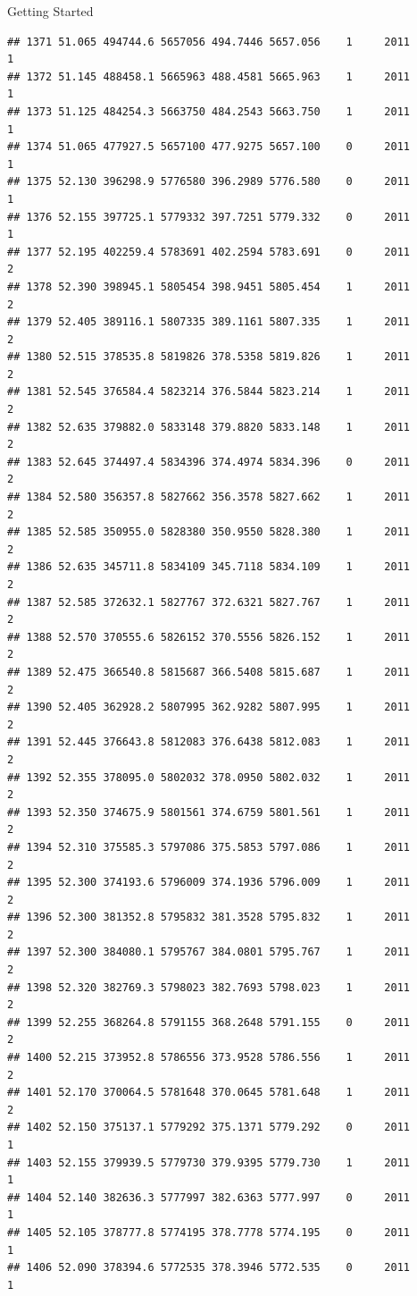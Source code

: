 \documentclass[
  ignorenonframetext,
]{beamer}
\begin{document}
\begin{frame}[fragile]{Getting Started}
\begin{verbatim}
## 1371 51.065 494744.6 5657056 494.7446 5657.056    1     2011        1
## 1372 51.145 488458.1 5665963 488.4581 5665.963    1     2011        1
## 1373 51.125 484254.3 5663750 484.2543 5663.750    1     2011        1
## 1374 51.065 477927.5 5657100 477.9275 5657.100    0     2011        1
## 1375 52.130 396298.9 5776580 396.2989 5776.580    0     2011        1
## 1376 52.155 397725.1 5779332 397.7251 5779.332    0     2011        1
## 1377 52.195 402259.4 5783691 402.2594 5783.691    0     2011        2
## 1378 52.390 398945.1 5805454 398.9451 5805.454    1     2011        2
## 1379 52.405 389116.1 5807335 389.1161 5807.335    1     2011        2
## 1380 52.515 378535.8 5819826 378.5358 5819.826    1     2011        2
## 1381 52.545 376584.4 5823214 376.5844 5823.214    1     2011        2
## 1382 52.635 379882.0 5833148 379.8820 5833.148    1     2011        2
## 1383 52.645 374497.4 5834396 374.4974 5834.396    0     2011        2
## 1384 52.580 356357.8 5827662 356.3578 5827.662    1     2011        2
## 1385 52.585 350955.0 5828380 350.9550 5828.380    1     2011        2
## 1386 52.635 345711.8 5834109 345.7118 5834.109    1     2011        2
## 1387 52.585 372632.1 5827767 372.6321 5827.767    1     2011        2
## 1388 52.570 370555.6 5826152 370.5556 5826.152    1     2011        2
## 1389 52.475 366540.8 5815687 366.5408 5815.687    1     2011        2
## 1390 52.405 362928.2 5807995 362.9282 5807.995    1     2011        2
## 1391 52.445 376643.8 5812083 376.6438 5812.083    1     2011        2
## 1392 52.355 378095.0 5802032 378.0950 5802.032    1     2011        2
## 1393 52.350 374675.9 5801561 374.6759 5801.561    1     2011        2
## 1394 52.310 375585.3 5797086 375.5853 5797.086    1     2011        2
## 1395 52.300 374193.6 5796009 374.1936 5796.009    1     2011        2
## 1396 52.300 381352.8 5795832 381.3528 5795.832    1     2011        2
## 1397 52.300 384080.1 5795767 384.0801 5795.767    1     2011        2
## 1398 52.320 382769.3 5798023 382.7693 5798.023    1     2011        2
## 1399 52.255 368264.8 5791155 368.2648 5791.155    0     2011        2
## 1400 52.215 373952.8 5786556 373.9528 5786.556    1     2011        2
## 1401 52.170 370064.5 5781648 370.0645 5781.648    1     2011        2
## 1402 52.150 375137.1 5779292 375.1371 5779.292    0     2011        1
## 1403 52.155 379939.5 5779730 379.9395 5779.730    1     2011        1
## 1404 52.140 382636.3 5777997 382.6363 5777.997    0     2011        1
## 1405 52.105 378777.8 5774195 378.7778 5774.195    0     2011        1
## 1406 52.090 378394.6 5772535 378.3946 5772.535    0     2011        1

\end{verbatim}
\end{frame}
\end{document}
